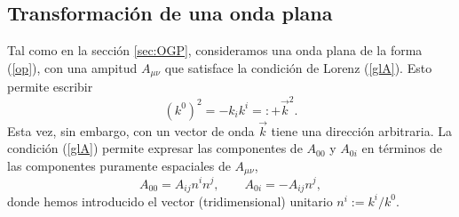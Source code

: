 \subsection{Transformación de una onda plana}\label{sec:TOP}
Tal como en la sección \ref{sec:OGP}, consideramos una onda plana de la forma (\ref{op}), con una ampitud $A_{\mu\nu}$ que satisface la condición de Lorenz  (\ref{glA}). Esto permite escribir
\begin{equation}
 (k^0)^2=-k_ik^i=:+\vec{k}^2.
\end{equation}
Esta vez, sin embargo, con un vector de onda $\vec{k}$ tiene una dirección arbitraria. La condición (\ref{glA}) permite expresar las componentes de $A_{00}$ y $A_{0i}$ en términos de las componentes puramente espaciales de $A_{\mu\nu}$,
\begin{equation}\label{A000i}
A_{00}=A_{ij}n^in^j, \qquad A_{0i}=-A_{ij}n^j,
\end{equation}
donde hemos introducido el vector (tridimensional) unitario $n^i:=k^i/k^0$.

